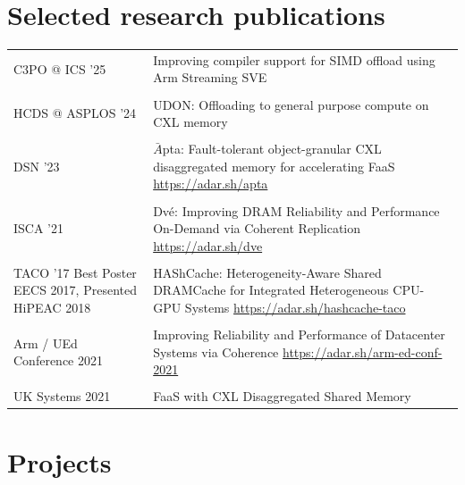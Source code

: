 \documentclass[a4paper,10pt]{article} %
\begin{document}
\section{Selected research publications}
\begin{tabular}{p{3cm}p{11cm}}
C3PO @ ICS '25 &  Improving compiler support for SIMD offload using Arm Streaming SVE \\
& \\
HCDS @ ASPLOS '24 &  UDON: Offloading to general purpose compute on CXL memory\\
& \\
DSN '23 &  $\bar{A}$pta: Fault-tolerant object-granular CXL disaggregated memory for \newline accelerating FaaS \hfill \href{https://adar.sh/apta}{https://adar.sh/apta}\\
& \\
ISCA '21 & Dv\'e: Improving DRAM Reliability and Performance On-Demand via \newline Coherent Replication \hfill  \href{https://adar.sh/dve}{https://adar.sh/dve}\\
&\\
TACO '17 \newline \footnotesize{Best Poster EECS 2017, Presented HiPEAC 2018} & HAShCache: Heterogeneity-Aware Shared DRAMCache for Integrated Heterogeneous CPU-GPU Systems  \hfill
\href{https://adar.sh/hashcache-taco}{https://adar.sh/hashcache-taco}\\
&\\
Arm / UEd Conference 2021 & Improving Reliability and Performance of Datacenter Systems via \newline Coherence \hfill  \href{https://adar.sh/arm-ed-conf-2021}{https://adar.sh/arm-ed-conf-2021}\\	
&\\
UK Systems 2021 & FaaS with CXL Disaggregated Shared Memory
\end{tabular}

\vspace{0.05in}

\section{Projects}
\end{document}
